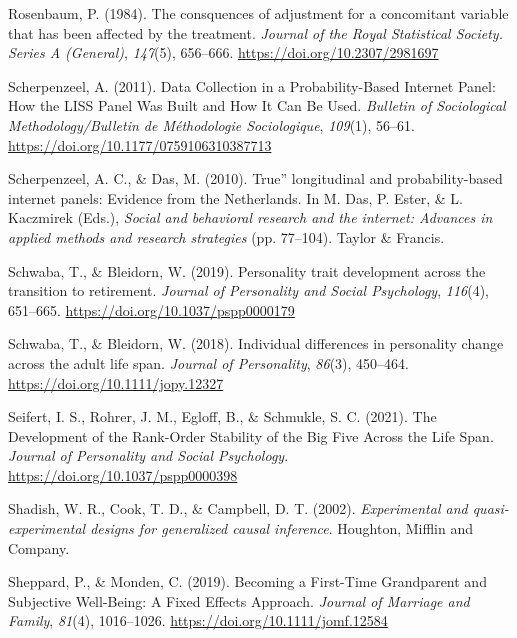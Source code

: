 \documentclass[
  english,
  man, noextraspace]{apa7}
\begin{document}
\leavevmode\hypertarget{ref-rosenbaumConsquencesAdjustmentConcomitant1984}{}%
Rosenbaum, P. (1984). The consquences of adjustment for a concomitant variable that has been affected by the treatment. \emph{Journal of the Royal Statistical Society. Series A (General)}, \emph{147}(5), 656--666. \url{https://doi.org/10.2307/2981697}

\leavevmode\hypertarget{ref-scherpenzeelDataCollectionProbabilityBased2011}{}%
Scherpenzeel, A. (2011). Data Collection in a Probability-Based Internet Panel: How the LISS Panel Was Built and How It Can Be Used. \emph{Bulletin of Sociological Methodology/Bulletin de Méthodologie Sociologique}, \emph{109}(1), 56--61. \url{https://doi.org/10.1177/0759106310387713}

\leavevmode\hypertarget{ref-scherpenzeelTrueLongitudinalProbabilitybased2010}{}%
Scherpenzeel, A. C., \& Das, M. (2010). True'' longitudinal and probability-based internet panels: Evidence from the Netherlands. In M. Das, P. Ester, \& L. Kaczmirek (Eds.), \emph{Social and behavioral research and the internet: Advances in applied methods and research strategies} (pp. 77--104). Taylor \& Francis.

\leavevmode\hypertarget{ref-schwabaPersonalityTraitDevelopment2019}{}%
Schwaba, T., \& Bleidorn, W. (2019). Personality trait development across the transition to retirement. \emph{Journal of Personality and Social Psychology}, \emph{116}(4), 651--665. \url{https://doi.org/10.1037/pspp0000179}

\leavevmode\hypertarget{ref-schwabaIndividualDifferencesPersonality2018}{}%
Schwaba, T., \& Bleidorn, W. (2018). Individual differences in personality change across the adult life span. \emph{Journal of Personality}, \emph{86}(3), 450--464. \url{https://doi.org/10.1111/jopy.12327}

\leavevmode\hypertarget{ref-seifertDevelopmentRankOrderStability2021}{}%
Seifert, I. S., Rohrer, J. M., Egloff, B., \& Schmukle, S. C. (2021). The Development of the Rank-Order Stability of the Big Five Across the Life Span. \emph{Journal of Personality and Social Psychology}. \url{https://doi.org/10.1037/pspp0000398}

\leavevmode\hypertarget{ref-shadishExperimentalQuasiexperimentalDesigns2002}{}%
Shadish, W. R., Cook, T. D., \& Campbell, D. T. (2002). \emph{Experimental and quasi-experimental designs for generalized causal inference}. Houghton, Mifflin and Company.

\leavevmode\hypertarget{ref-sheppardBecomingFirstTimeGrandparent2019}{}%
Sheppard, P., \& Monden, C. (2019). Becoming a First-Time Grandparent and Subjective Well-Being: A Fixed Effects Approach. \emph{Journal of Marriage and Family}, \emph{81}(4), 1016--1026. \url{https://doi.org/10.1111/jomf.12584}
\end{document}
